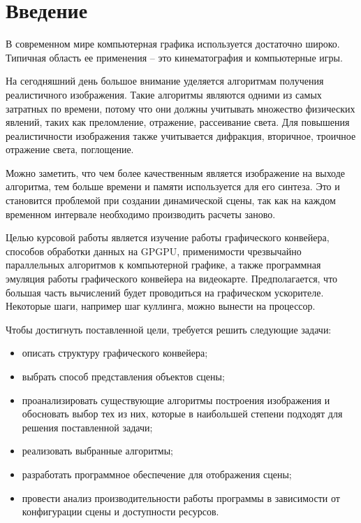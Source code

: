 \chapter*{Введение}

В современном мире компьютерная графика используется достаточно широко. Типичная область ее применения – это кинематография и компьютерные игры.

На сегодняшний день большое внимание уделяется алгоритмам получения реалистичного изображения. Такие алгоритмы являются одними из самых затратных по времени, потому что они должны учитывать множество физических явлений, таких как преломление, отражение, рассеивание света. Для повышения реалистичности изображения также учитывается дифракция, вторичное, троичное отражение света, поглощение. 

Можно заметить, что чем более качественным является изображение на выходе алгоритма, тем больше времени и памяти используется для его синтеза. Это и становится проблемой при создании динамической сцены, так как на каждом временном интервале необходимо производить расчеты заново. 

Целью курсовой работы является изучение работы графического конвейера, способов обработки данных на GPGPU, применимости чрезвычайно параллельных алгоритмов к компьютерной графике, а также программная эмуляция работы графического конвейера на видеокарте. 
Предполагается, что большая часть вычислений будет проводиться на графическом ускорителе. Некоторые шаги, например шаг куллинга, можно вынести на процессор. 

Чтобы достигнуть поставленной цели, требуется решить следующие задачи:

\begin{itemize}
	\item описать структуру графического конвейера;
    \item выбрать способ представления объектов сцены;
    \item проанализировать существующие алгоритмы построения изображения и обосновать выбор тех из них, которые в наибольшей степени подходят для решения поставленной задачи;
    \item реализовать выбранные алгоритмы;
    \item разработать программное обеспечение для отображения сцены; 
    \item провести анализ производительности работы программы в зависимости от конфигурации сцены и доступности ресурсов.
\end{itemize}
